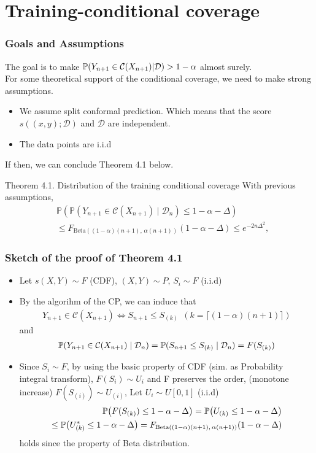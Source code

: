 \documentclass[compress]{beamer}
\begin{document}
\section{Training-conditional coverage}
\begin{frame}\frametitle{Goals and Assumptions}
	The goal is to make $\mathbb{P}(Y_{n+1}\in \mathcal{C}(X_{n+1})|\cD) > 1-\alpha$ almost surely.\\

	For some theoretical support of the conditional coverage, we need to make strong assumptions.
	\begin{itemize}
		\item We assume split conformal prediction. Which means that the score $s((x, y); \mathcal{D})$ and $\mathcal{D}$ are independent.
		\item The data points are i.i.d
	\end{itemize}
	If then, we can conclude Theorem 4.1 below.
	\begin{block}{Theorem 4.1. Distribution of the training conditional coverage}
		With previous assumptions,
		\begin{align*}
			&\mathbb{P}\left( 
			\mathbb{P}(Y_{n+1} \in \mathcal{C}(X_{n+1}) \mid \mathcal{D}_n) 
			\leq 1 - \alpha - \Delta 
			\right) 
			\\&\leq F_{\text{Beta}((1-\alpha)(n+1),\, \alpha(n+1))}(1 - \alpha - \Delta) 
			\leq e^{-2n\Delta^2},
		\end{align*}
	\end{block}
\end{frame}

\begin{frame}\frametitle{Sketch of the proof of Theorem 4.1}
	\begin{itemize}
		\item Let $s(X, Y) \sim F$ (CDF), $(X, Y)\sim P$, $S_i \sim F$ (i.i.d)
		\item By the algorihm of the CP, we can induce that
		\begin{align*}
			Y_{n+1}\in \mathcal{C}(X_{n+1}) \Leftrightarrow S_{n+1}\le S_{(k)} ~~(k = \lceil(1-\alpha)(n+1)\rceil)
		\end{align*}
		and
		\begin{align*}
			\P(Y_{n+1}\in\cC(X_{n+1})\mid \cD_n) = \P(S_{n+1}\leq S_{(k)}\mid \cD_n) = F(S_{(k)})
		\end{align*}
		\item Since $S_{i}\sim F$, by using the basic property of CDF (sim. as Probability integral transform), $F(S_i) \sim U_i$ and F preserves the order, (monotone increase)
		$F(S_{(i)}) \sim U_{(i)}$,\newline
		Let $U_i \sim U[0, 1]$ (i.i.d)
		\begin{align*}
			\P\big(F(S_{(k)})\leq 1-\alpha-\Delta\big) = \P\big(U_{(k)} \leq 1-\alpha-\Delta\big) \\
			\leq \P\big(U^*_{(k)}\leq 1-\alpha-\Delta\big) = F_{\text{Beta}((1-\alpha)(n+1),\, \alpha(n+1))}(1 - \alpha - \Delta)
		\end{align*}
		holds since the property of Beta distribution. 
	\end{itemize}
\end{frame}
\end{document}
